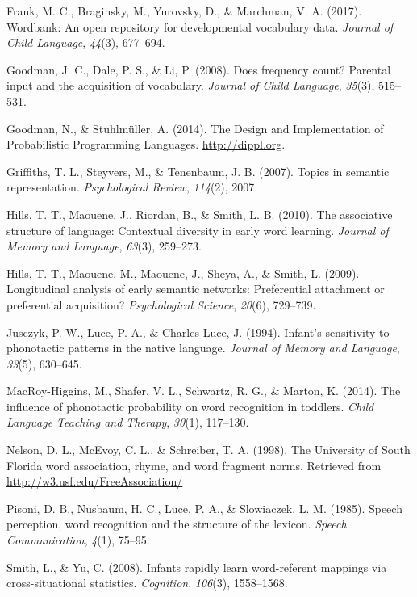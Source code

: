 \documentclass[10pt, letterpaper]{article}
\begin{document}
\hypertarget{ref-frank2017}{}
Frank, M. C., Braginsky, M., Yurovsky, D., \& Marchman, V. A. (2017).
Wordbank: An open repository for developmental vocabulary data.
\emph{Journal of Child Language}, \emph{44}(3), 677--694.

\hypertarget{ref-goodman2008}{}
Goodman, J. C., Dale, P. S., \& Li, P. (2008). Does frequency count?
Parental input and the acquisition of vocabulary. \emph{Journal of Child
Language}, \emph{35}(3), 515--531.

\hypertarget{ref-dippl}{}
Goodman, N., \& Stuhlmüller, A. (2014). The Design and Implementation of
Probabilistic Programming Languages. \url{http://dippl.org}.

\hypertarget{ref-griffiths07}{}
Griffiths, T. L., Steyvers, M., \& Tenenbaum, J. B. (2007). Topics in
semantic representation. \emph{Psychological Review}, \emph{114}(2),
2007.

\hypertarget{ref-hills2010}{}
Hills, T. T., Maouene, J., Riordan, B., \& Smith, L. B. (2010). The
associative structure of language: Contextual diversity in early word
learning. \emph{Journal of Memory and Language}, \emph{63}(3), 259--273.

\hypertarget{ref-hills2009}{}
Hills, T. T., Maouene, M., Maouene, J., Sheya, A., \& Smith, L. (2009).
Longitudinal analysis of early semantic networks: Preferential
attachment or preferential acquisition? \emph{Psychological Science},
\emph{20}(6), 729--739.

\hypertarget{ref-jusczyk1994}{}
Jusczyk, P. W., Luce, P. A., \& Charles-Luce, J. (1994). Infant's
sensitivity to phonotactic patterns in the native language.
\emph{Journal of Memory and Language}, \emph{33}(5), 630--645.

\hypertarget{ref-higgins2014}{}
MacRoy-Higgins, M., Shafer, V. L., Schwartz, R. G., \& Marton, K.
(2014). The influence of phonotactic probability on word recognition in
toddlers. \emph{Child Language Teaching and Therapy}, \emph{30}(1),
117--130.

\hypertarget{ref-nelson1998}{}
Nelson, D. L., McEvoy, C. L., \& Schreiber, T. A. (1998). The University
of South Florida word association, rhyme, and word fragment norms.
Retrieved from \url{http://w3.usf.edu/FreeAssociation/}

\hypertarget{ref-pisoni1985}{}
Pisoni, D. B., Nusbaum, H. C., Luce, P. A., \& Slowiaczek, L. M. (1985).
Speech perception, word recognition and the structure of the lexicon.
\emph{Speech Communication}, \emph{4}(1), 75--95.

\hypertarget{ref-smith2008}{}
Smith, L., \& Yu, C. (2008). Infants rapidly learn word-referent
mappings via cross-situational statistics. \emph{Cognition},
\emph{106}(3), 1558--1568.
\end{document}
